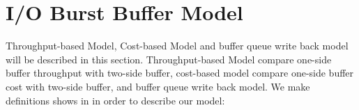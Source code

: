 \documentclass[JIP,draft]{ipsj}
\begin{document}

\section{I/O Burst Buffer Model}


Throughput-based Model, Cost-based Model and buffer queue write back model will be described in this section.
Throughput-based Model compare one-side buffer throughput with two-side buffer, cost-based model compare one-side buffer cost with two-side buffer, and buffer queue write back model. 
We make definitions shows in  in order to describe our model:
\end{document}
